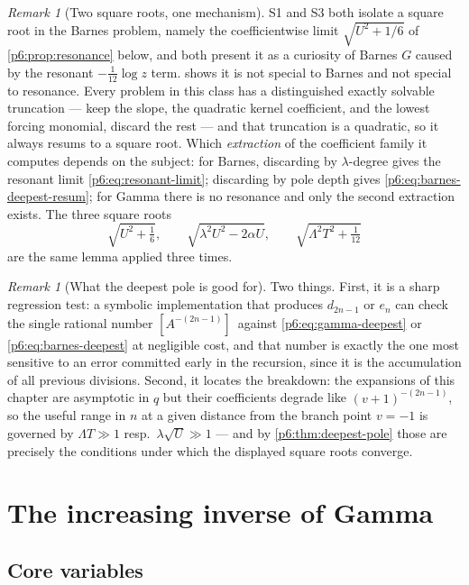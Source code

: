 \documentclass[11pt,a4paper,oneside]{book}
\theoremstyle{plain}
\theoremstyle{definition}
\theoremstyle{remark}
\newtheorem{remark}[theorem]{Remark}
\newcommand{\Coef}[1]{[#1]\,}
\begin{document}
\begin{remark}[Two square roots, one mechanism]\label{p6:rem:two-square-roots}
S1 and S3 both isolate a square root in the Barnes problem, namely the
coefficientwise limit $\sqrt{U^{2}+1/6}$ of \cref{p6:prop:resonance} below,
and both present it as a curiosity of Barnes $G$ caused by the resonant
$-\tfrac1{12}\log z$ term.   shows it is not special
to Barnes and not special to resonance.  Every problem in this class has a
distinguished exactly solvable truncation --- keep the slope, the quadratic
kernel coefficient, and the lowest forcing monomial, discard the rest --- and
that truncation is a quadratic, so it always resums to a square root.  Which
\emph{extraction} of the coefficient family it computes depends on the
subject: for Barnes, discarding by $\lambda$-degree gives the resonant limit
\eqref{p6:eq:resonant-limit}; discarding by pole depth gives
\eqref{p6:eq:barnes-deepest-resum}; for Gamma there is no resonance and only
the second extraction exists.  The three square roots
\[
 \sqrt{U^{2}+\tfrac16},\qquad
 \sqrt{\lambda^{2}U^{2}-2\alpha U},\qquad
 \sqrt{\Lambda^{2}T^{2}+\tfrac1{12}}
\]
are the same lemma applied three times.
\end{remark}

\begin{remark}[What the deepest pole is good for]\label{p6:rem:deepest-use}
Two things.  First, it is a sharp regression test: a symbolic implementation
that produces $d_{2n-1}$ or $e_n$ can check the single rational number
$\Coef{A^{-(2n-1)}}$ against \eqref{p6:eq:gamma-deepest} or
\eqref{p6:eq:barnes-deepest} at negligible cost, and that number is exactly
the one most sensitive to an error committed early in the recursion, since it
is the accumulation of all previous divisions.  Second, it locates the
breakdown: the expansions of this chapter are asymptotic in $q$ but their
coefficients degrade like $(v+1)^{-(2n-1)}$, so the useful range in $n$ at a
given distance from the branch point $v=-1$ is governed by
$\Lambda T\gg1$ resp.\ $\lambda\sqrt U\gg1$ --- and by
\cref{p6:thm:deepest-pole} those are precisely the conditions under which the
displayed square roots converge.
\end{remark}

\section{The increasing inverse of Gamma}
\label{p6:sec:gamma}

\subsection{Core variables}
\end{document}
